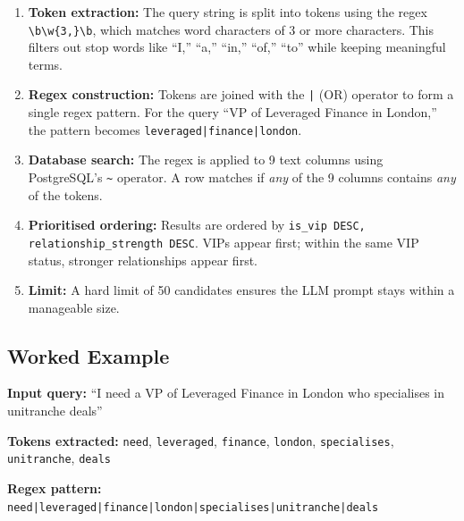 \documentclass[12pt, a4paper]{report}
\begin{document}
\begin{enumerate}[itemsep=4pt]
    \item \textbf{Token extraction:} The query string is split into tokens using the regex \texttt{\textbackslash b\textbackslash w\{3,\}\textbackslash b}, which matches word characters of 3 or more characters. This filters out stop words like ``I,'' ``a,'' ``in,'' ``of,'' ``to'' while keeping meaningful terms.
    \item \textbf{Regex construction:} Tokens are joined with the \texttt{|} (OR) operator to form a single regex pattern. For the query ``VP of Leveraged Finance in London,'' the pattern becomes \texttt{leveraged|finance|london}.
    \item \textbf{Database search:} The regex is applied to 9 text columns using PostgreSQL's \texttt{\textasciitilde} operator. A row matches if \emph{any} of the 9 columns contains \emph{any} of the tokens.
    \item \textbf{Prioritised ordering:} Results are ordered by \texttt{is\_vip DESC, relationship\_strength DESC}. VIPs appear first; within the same VIP status, stronger relationships appear first.
    \item \textbf{Limit:} A hard limit of 50 candidates ensures the LLM prompt stays within a manageable size.
\end{enumerate}

\subsection{Worked Example}

\textbf{Input query:} ``I need a VP of Leveraged Finance in London who specialises in unitranche deals''

\textbf{Tokens extracted:} \texttt{need}, \texttt{leveraged}, \texttt{finance}, \texttt{london}, \texttt{specialises}, \texttt{unitranche}, \texttt{deals}

\textbf{Regex pattern:} \texttt{need|leveraged|finance|london|specialises|unitranche|deals}
\end{document}
